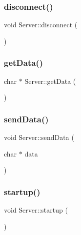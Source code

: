 \subsubsection{\texorpdfstring{disconnect()}{disconnect()}}
{\footnotesize\ttfamily void Server\+::disconnect (\begin{DoxyParamCaption}{ }\end{DoxyParamCaption})}

\mbox{\label{classServer_a6b6c39b02aeae611dcb2a9f2f5a8d801}} 
\subsubsection{\texorpdfstring{get\+Data()}{getData()}}
{\footnotesize\ttfamily char $\ast$ Server\+::get\+Data (\begin{DoxyParamCaption}{ }\end{DoxyParamCaption})}

\mbox{\label{classServer_a5061ce779b01e1c5cf8146022db8b08d}} 
\subsubsection{\texorpdfstring{send\+Data()}{sendData()}}
{\footnotesize\ttfamily void Server\+::send\+Data (\begin{DoxyParamCaption}\item[{char $\ast$}]{data }\end{DoxyParamCaption})}

\mbox{\label{classServer_aaa7517710dd809ba4d965eb83801fd05}} 
\subsubsection{\texorpdfstring{startup()}{startup()}}
{\footnotesize\ttfamily void Server\+::startup (\begin{DoxyParamCaption}{ }\end{DoxyParamCaption})}

\mbox{\label{classServer_aee9a13517df765d3c085fab605f24be4}} 
